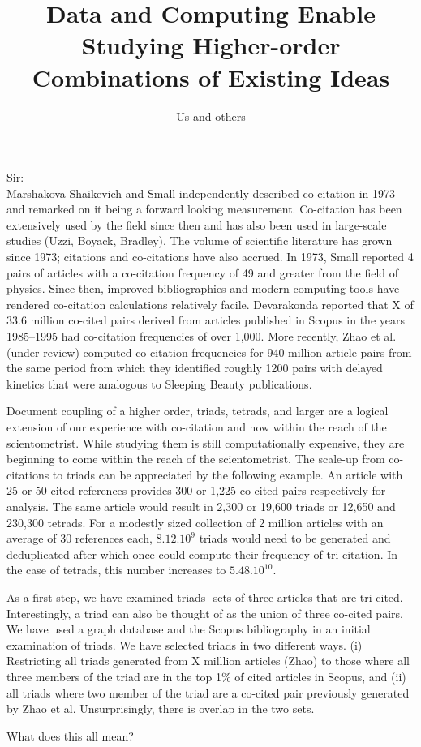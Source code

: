 \documentclass[notitlepage]{report}
\title{Data and Computing Enable Studying Higher-order Combinations of Existing Ideas}
\author{Us and others}
\date{}
\begin{document}
\maketitle
\thispagestyle{empty}
Sir:\\

Marshakova-Shaikevich and Small independently described co-citation in 1973 and remarked on it being a forward looking measurement. Co-citation has been extensively used by the field since then and has also been used in large-scale studies (Uzzi, Boyack, Bradley). The volume of scientific literature has grown since 1973; citations and co-citations have also accrued. In 1973, Small reported 4 pairs of articles with a co-citation frequency of 49 and greater from the field of physics. Since then, improved bibliographies and modern computing tools have rendered co-citation calculations relatively facile. Devarakonda reported that X of 33.6 million co-cited pairs derived from articles published in Scopus in the years 1985--1995 had co-citation frequencies of over 1,000. More recently, Zhao et al. (under review) computed co-citation frequencies for 940 million article pairs from the same period from which they identified roughly 1200 pairs with delayed kinetics that were analogous to Sleeping Beauty publications. 

Document coupling of a higher order, triads, tetrads, and larger are a logical extension of our experience with co-citation and now within the reach of the scientometrist. While studying them is still computationally expensive, they are beginning to come within the reach of the scientometrist. The scale-up from co-citations to triads can be appreciated by the following example. An article with 25 or 50 cited references provides 300 or 1,225 co-cited pairs respectively for analysis. The same article would result in 2,300 or 19,600 triads or 12,650 and  230,300 tetrads. For a modestly sized collection of 2 million articles with an average of 30 references each, $8.12 .10^9$ triads would need to be generated and deduplicated after which once could compute their frequency of tri-citation. In the case of tetrads, this number increases to $5.48.10^{10}$. 

As a first step, we have examined triads- sets of three articles that are tri-cited. Interestingly,  a triad can also be thought of as the union of three  co-cited pairs. We have used a graph database and the Scopus bibliography in an initial examination of triads. We  have selected triads in two different ways. (i) Restricting all triads generated from X milllion articles (Zhao) to those where all three members of the triad are in the top 1\% of cited articles in Scopus, and (ii) all triads where two member of the triad are a co-cited pair previously generated by Zhao et al. Unsurprisingly, there is overlap in the two sets. 

What does this all mean? 
\end{document}
